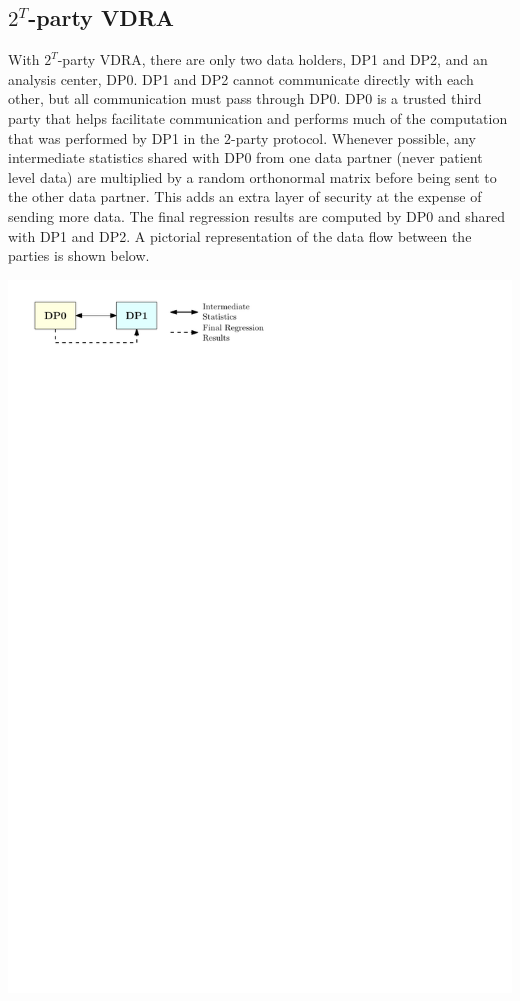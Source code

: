 \documentclass[12]{article}
\begin{document}
\subsection{$2^T$-party VDRA}

With $2^T$-party VDRA, there are only two data holders, DP1 and DP2, and an analysis center, DP0.  DP1 and DP2 cannot communicate directly with each other, but all communication must pass through DP0.  DP0 is a trusted third party that helps facilitate communication and performs much of the computation that was performed by DP1 in the $2$-party protocol.  Whenever possible, any intermediate statistics shared with DP0 from one data partner (never patient level data) are multiplied by a random orthonormal matrix before being sent to the other data partner.  This adds an extra layer of security at the expense of sending more data.  The final regression results are computed by DP0 and shared with DP1 and DP2.  A pictorial representation of the data flow between the parties is shown below.  
\begin{center}
	\includegraphics[page = 2]{images.pdf}
\end{center}
\end{document}
